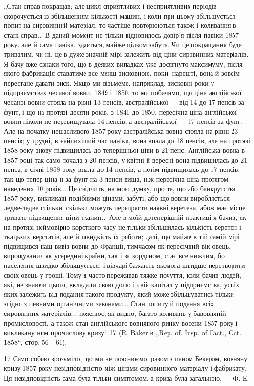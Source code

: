„Стан справ покращав; але цикл сприятливих і несприятливих
періодів скорочується із збільшенням кількості машин, і
коли при цьому збільшується попит на сировинний матеріал,
то частіше повторюються також і коливання в стані справ...
В даний момент не тільки відновилось довір’я після паніки
1857 року, але й сама паніка, здається, майже цілком забута.
Чи це покращання буде тривалим, чи ні, це в дуже значній
мірі залежить від ціни сировинних матеріалів. Я бачу вже ознаки
того, що в деяких випадках уже досягнуто максимуму, після
якого фабрикація ставатиме все менш зисковною, поки, нарешті,
вона й зовсім перестане давати зиск. Якщо ми візьмемо, наприклад,
зисковні роки у підприємствах чесаної вовни, 1849 і 1850,
то ми побачимо, що ціна англійської чесаної вовни стояла на
рівні 13 пенсів, австралійської — від 14 до 17 пенсів за фунт,
і що на протязі десяти років, з 1841 до 1850, пересічна ціна
англійської вовни ніколи не перевищувала 14 пенсів, а австралійської
— 17 пенсів за фунт. Але на початку нещасливого
1857 року австралійська вовна стояла на рівні 23 пенсів; у грудні,
в найлихіший час паніки, вона впала до 18 пенсів, але на протязі
1858 року знову підвищилась до теперішньої ціни в 21 пенс.
Англійська вовна в 1857 році так само почала з 20 пенсів, у квітні
й вересні вона підвищилась до 21 пенса, в січні 1858 року впала
до 14 пенсів, а потім підвищилась до 17 пенсів, так що тепер
ціна її за фунт на 3 пенси вища, ніж пересічна ціна протягом
наведених 10 років... Це свідчить, на мою думку, про те, що або
банкрутства 1857 року, викликані подібними цінами, забуті, або
що вовни виробляється ледве-ледве стільки, скільки можуть
перепрясти наявні веретена, абож має місце тривале підвищення
ціни тканин... Але в моїй дотеперішній практиці я бачив,
як на протязі неймовірно короткого часу не тільки збільшилась
кількість веретен і ткацьких верстатів, але й швидкість
їх роботи; далі, що майже в тій самій мірі підвищився наш вивіз
вовни до Франції, тимчасом як пересічний вік овець, вирощуваних
як усередині країни, так і за кордоном, стає все нижчим,
бо населення швидко збільшується, і вівчарі бажають якомога
швидше перетворити своїх овець у гроші. Тому я часто переживав
тяжке почуття, коли бачив людей, які, не знаючи цього, вкладали
свою долю і свій капітал у підприємства, успіх яких залежить від
подання такого продукту, який може збільшуватись тільки
згідно з певними органічними законами... Стан попиту й подання
всіх сировинних матеріалів... пояснює, як видно, багато коливань
у бавовняній промисловості, а також стан англійського вовняного
ринку восени 1857 року і викликану ним промислову кризу“ 17
(R. Baker в „Rep. of. Insp. of Fact., Oct. 1858“, стор. 56—61).

17    Само собою зрозуміло, що ми не пояснюємо, разом з паном Бекером,
вовняну кризу 1857 року невідповідністю між цінами сировинного матеріалу
і фабрикату. Ця невідповідність сама була тільки симптомом, а криза була
загальною. — Ф. Е.
